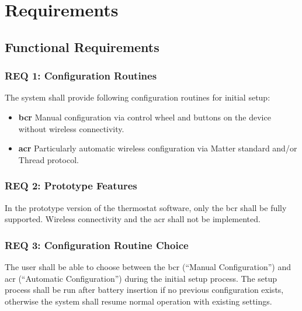 %
%

\chapter{Requirements}
\label{chap:Requirements}

\section{Functional Requirements}
\label{sec:Functional Requirements}

\subsection*{REQ 1: Configuration Routines}
\label{subsec:REQ 1: Configuration Routines}
The system shall provide following configuration routines for initial setup:
\begin{itemize}
    \item \textbf{\ac{bcr}} Manual configuration via control wheel and buttons on the device without wireless connectivity.
    \item \textbf{\ac{acr}} Particularly automatic wireless configuration via Matter standard and/or Thread protocol.
\end{itemize}

\subsection*{REQ 2: Prototype Features}
\label{subsec:REQ 2: Prototype Features}
In the prototype version of the thermostat software, only the \acs{bcr} shall be fully supported. Wireless connectivity and the \acs{acr} shall not be implemented.

\subsection*{REQ 3: Configuration Routine Choice}
\label{subsec:REQ 3: Configuration Routine Choice}
The user shall be able to choose between the \acs{bcr} (``Manual Configuration'') and \acs{acr} (``Automatic Configuration'') during the initial setup process. The setup process shall be run after battery insertion if no previous configuration exists, otherwise the system shall resume normal operation with existing settings.

